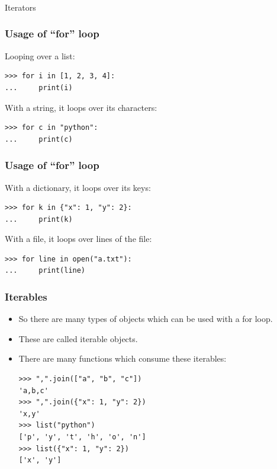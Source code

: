 \begin{frame}[fragile]\frametitle{}
\begin{center}
{\Large Iterators}
\end{center}
\end{frame}

\begin{frame}[fragile]\frametitle{Usage of ``for'' loop}
Looping over a list:
\begin{lstlisting}
>>> for i in [1, 2, 3, 4]:
...     print(i)
\end{lstlisting}

With a string, it loops over its characters:
\begin{lstlisting}
>>> for c in "python":
...     print(c)
\end{lstlisting}
\end{frame}

\begin{frame}[fragile]\frametitle{Usage of ``for'' loop}
With a dictionary, it loops over its keys:
\begin{lstlisting}
>>> for k in {"x": 1, "y": 2}:
...     print(k)
\end{lstlisting}

With a file, it loops over lines of the file:
\begin{lstlisting}
>>> for line in open("a.txt"):
...     print(line)
\end{lstlisting}
\end{frame}

\begin{frame}[fragile]\frametitle{Iterables}
    \begin{itemize}
    \item  So there are many types of objects which can be used with a for loop. 
    \item These are called iterable objects.
	\item There are many functions which consume these iterables:
	\begin{lstlisting}
>>> ",".join(["a", "b", "c"])
'a,b,c'
>>> ",".join({"x": 1, "y": 2})
'x,y'
>>> list("python")
['p', 'y', 't', 'h', 'o', 'n']
>>> list({"x": 1, "y": 2})
['x', 'y']
\end{lstlisting}
    \end{itemize}
\end{frame}

